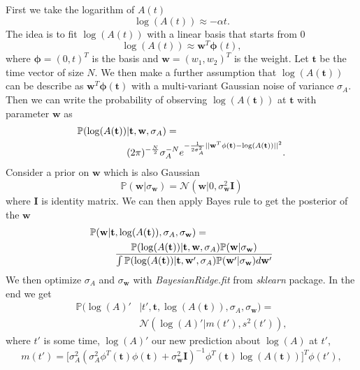 \documentclass[
reprint,
 amsmath,amssymb,
 aps,
url
]{revtex4-1}
\begin{document}
First we take the logarithm of $A(t)$
\begin{equation}
	\log(A(t))\approx -\alpha t.
\end{equation}
The idea is to fit $\log(A(t))$ with a linear basis that starts from $0$
\begin{equation}
	\log(A(t)) \approx \mathbf{w}^T\mathbf{\phi}(t),
\end{equation}
where $\mathbf{\phi}=(0,t)^T$ is the basis and $\mathbf{w}=(w_1,w_2)^T$ is the weight. Let $\mathbf{t}$ be the time vector of size $N$. We then make a further assumption that $\log(A(\mathbf{t}))$ can be describe as $\mathbf{w}^T\mathbf{\phi}(\mathbf{t})$ with a multi-variant Gaussian noise of variance $\sigma_A$. Then we can write the probability of observing $\log(A(\mathbf{t}))$ at $\mathbf{t}$ with parameter $\mathbf{w}$ as
\begin{align}
	\notag
	\mathbb{P}(\log(A(\mathbf{t}))&|\mathbf{t},\mathbf{w},\sigma_A) = \\
	&(2\pi)^{-\frac{N}{2}}\sigma_A^{-N}e^{-\frac{1}{2\sigma_A^2}||\mathbf{w}^T\mathbf{\phi}(\mathbf{t})-\log(A(\mathbf{t}))||^2}.
\end{align}
Consider a prior on $\mathbf{w}$ which is also Gaussian
\begin{equation}
	\mathbb{P}(\mathbf{w}|\sigma_\mathbf{w}) = \mathcal{N}(\mathbf{w}|0,\sigma_\mathbf{w}^2\mathbf{I})
\end{equation}
where $\mathbf{I}$ is identity matrix. We can then apply Bayes rule to get the posterior of the $\mathbf{w}$
\begin{align}
	\notag
	\mathbb{P}(\mathbf{w}|\mathbf{t}&,\log(A(\mathbf{t})),\sigma_A,\sigma_\mathbf{w}) = \\
	&\frac{\mathbb{P}(\log(A(\mathbf{t}))|\mathbf{t},\mathbf{w},\sigma_A)\mathbb{P}(\mathbf{w}|\sigma_\mathbf{w})}{\int\mathbb{P}(\log(A(\mathbf{t}))|\mathbf{t},\mathbf{w}',\sigma_A)\mathbb{P}(\mathbf{w}'|\sigma_\mathbf{w})d\mathbf{w}'}
\end{align}
We then optimize $\sigma_A$ and $\sigma_\mathbf{w}$ with \textit{BayesianRidge.fit} from \textit{sklearn} package. In the end we get\cite{kermode_james_px914_2020}
\begin{align}
	\mathbb{P}(\log(A)'&|t',\mathbf{t},\log(A(\mathbf{t})),\sigma_A,\sigma_\mathbf{w})=\\
	&\mathcal{N}(\log(A)'|m(t'),s^2(t')),
\end{align}
where $t'$ is some time, $\log(A)'$ our new prediction about $\log(A)$ at $t'$,
\begin{equation}
	m(t') = \big[\sigma^2_A(\sigma^2_A\phi^T(\mathbf{t})\phi(\mathbf{t})+\sigma^2_\mathbf{w}\mathbf{I})^{-1}\phi^T(\mathbf{t})\log(A(\mathbf{t}))\big]^T\phi(t'),
\end{equation}
\end{document}
